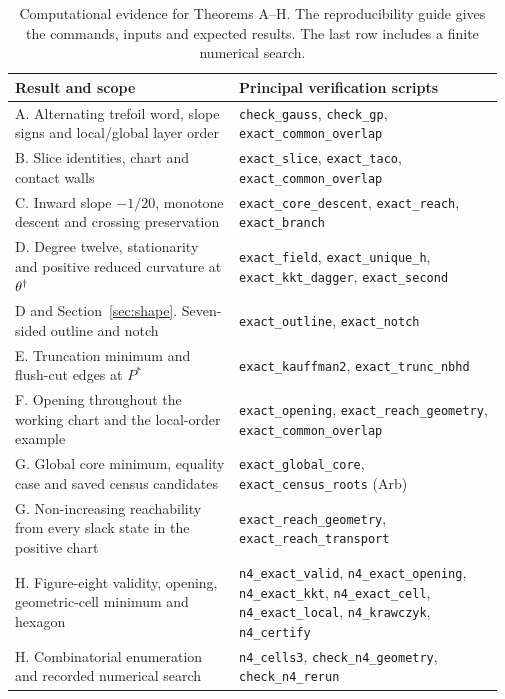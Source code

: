 \begin{table}[tbp]
\centering\small
\renewcommand{\arraystretch}{1.15}
\begin{tabular}{@{}>{\raggedright\arraybackslash}p{0.445\linewidth}@{\hspace{0.035\linewidth}}>{\raggedright\arraybackslash}p{0.52\linewidth}@{}}
\hline
Result and scope & Principal verification scripts\\
\hline
A. Alternating trefoil word, slope signs and local/global layer order &
\texttt{check\_gauss}, \texttt{check\_gp}, \texttt{exact\_common\_overlap}\\
B. Slice identities, chart and contact walls &
\texttt{exact\_slice}, \texttt{exact\_taco}, \texttt{exact\_common\_overlap}\\
C. Inward slope $-1/20$, monotone descent and crossing preservation &
\texttt{exact\_core\_descent}, \texttt{exact\_reach}, \texttt{exact\_branch}\\
D. Degree twelve, stationarity and positive reduced curvature at $\theta^\dagger$ &
\texttt{exact\_field}, \texttt{exact\_unique\_h}, \texttt{exact\_kkt\_dagger}, \texttt{exact\_second}\\
D and Section~\ref{sec:shape}. Seven-sided outline and notch &
\texttt{exact\_outline}, \texttt{exact\_notch}\\
E. Truncation minimum and flush-cut edges at $P^*$ &
\texttt{exact\_kauffman2}, \texttt{exact\_trunc\_nbhd}\\
F. Opening throughout the working chart and the local-order example &
\texttt{exact\_opening}, \texttt{exact\_reach\_geometry}, \texttt{exact\_common\_overlap}\\
G. Global core minimum, equality case and saved census candidates &
\texttt{exact\_global\_core}, \texttt{exact\_census\_roots} (Arb)\\
G. Non-increasing reachability from every slack state in the positive chart &
\texttt{exact\_reach\_geometry}, \texttt{exact\_reach\_transport}\\
H. Figure-eight validity, opening, geometric-cell minimum and hexagon &
\texttt{n4\_exact\_valid}, \texttt{n4\_exact\_opening}, \texttt{n4\_exact\_kkt}, \texttt{n4\_exact\_cell}, \texttt{n4\_exact\_local}, \texttt{n4\_krawczyk}, \texttt{n4\_certify}\\
H. Combinatorial enumeration and recorded numerical search &
\texttt{n4\_cells3}, \texttt{check\_n4\_geometry}, \texttt{check\_n4\_rerun}\\
\hline
\end{tabular}
\smallskip\caption{Computational evidence for Theorems A--H. The reproducibility guide gives the commands, inputs and expected results. The last row includes a finite numerical search.}
\label{tab:suite}
\end{table}

